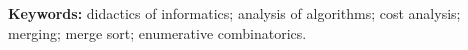\bigskip

\noindent\textbf{Keywords:} didactics of informatics; analysis of
  algorithms; cost analysis; merging; merge sort; enumerative
  combinatorics.

\bigskip
